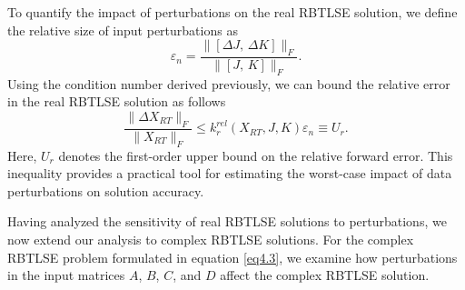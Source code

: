 \documentclass[preprint,11pt,3p]{elsarticle}
\begin{document}
To quantify the impact of perturbations on the real RBTLSE solution, we define the relative size of input perturbations as
\begin{equation}\label{eq5.91}
	\varepsilon_n = \frac{\|[\Delta J, \, \Delta K]\|_F}{\|[J, \, K]\|_F}.
	\end{equation}
Using the condition number derived previously, we can bound the relative error in the real RBTLSE solution as follows
\begin{equation}\label{eq5.10}
	\frac{\| \Delta X_{RT} \|_F}{\|X_{RT} \|_F} \leq \mathit{k}^{rel}_{r}(X_{RT},J,K) \varepsilon_n \equiv U_r.
\end{equation}
Here, $U_r$ denotes the first-order upper bound on the relative forward error. This inequality provides a practical tool for estimating the worst-case impact of data perturbations on solution accuracy.

Having analyzed the sensitivity of real RBTLSE solutions to perturbations, we now extend our analysis to complex RBTLSE solutions. For the complex RBTLSE problem formulated in equation \eqref{eq4.3}, we examine how perturbations in the input matrices $A$, $B$, $C$, and $D$ affect the complex RBTLSE solution.
\end{document}
